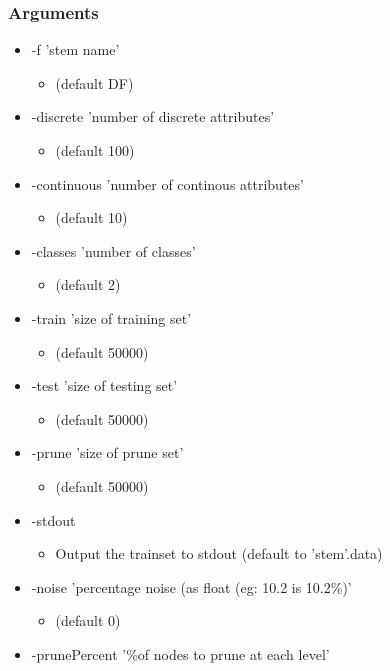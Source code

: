 \subsubsection*{Arguments}

\begin{itemize}
\item -f 'stem name'\begin{itemize}
\item (default DF)\end{itemize}
\item -discrete 'number of discrete attributes'\begin{itemize}
\item (default 100)\end{itemize}
\item -continuous 'number of continous attributes'\begin{itemize}
\item (default 10)\end{itemize}
\item -classes 'number of classes'\begin{itemize}
\item (default 2)\end{itemize}
\item -train 'size of training set'\begin{itemize}
\item (default 50000)\end{itemize}
\item -test 'size of testing set'\begin{itemize}
\item (default 50000)\end{itemize}
\item -prune 'size of prune set'\begin{itemize}
\item (default 50000)\end{itemize}
\item -stdout\begin{itemize}
\item Output the trainset to stdout (default to 'stem'.data)\end{itemize}
\item -noise 'percentage noise (as float (eg: 10.2 is 10.2\%)'\begin{itemize}
\item (default 0)\end{itemize}
\item -prune\-Percent '\%of nodes to prune at each level'\begin{itemize}

\end{itemize}
\end{itemize}
